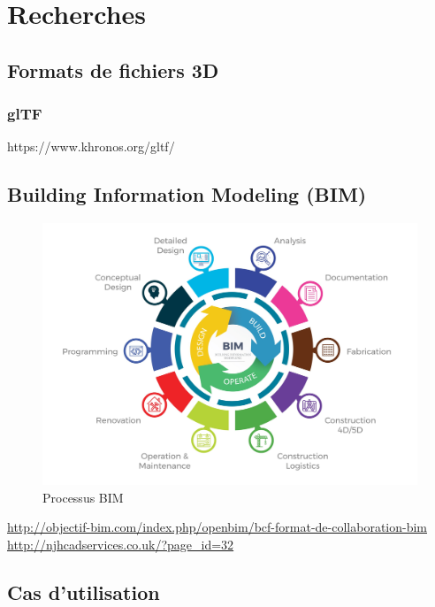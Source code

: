 \chapter{Recherches}

\label{Chapter2}

\section{Formats de fichiers 3D}

\subsection{glTF}
https://www.khronos.org/gltf/

\section{Building Information Modeling (BIM)}

\begin{figure}
    \centering
    \includegraphics[width=\linewidth]{Figures/bim-process.jpg}
    \caption{Processus BIM}
    \label{fig:bim-process}
\end{figure}

\url{http://objectif-bim.com/index.php/openbim/bcf-format-de-collaboration-bim}
\url{http://njhcadservices.co.uk/?page_id=32}

\section{Cas d'utilisation}


